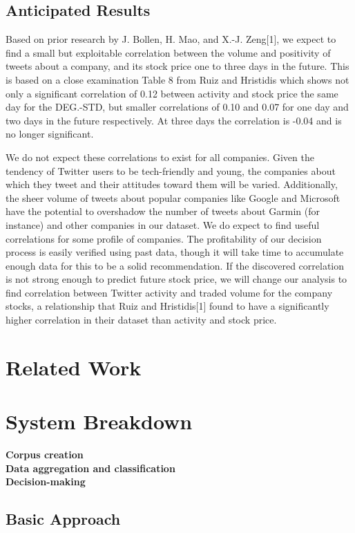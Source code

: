 \documentclass[letterpaper]{article}
\begin{document}
\subsection{Anticipated Results}
Based on prior research by J. Bollen, H. Mao, and X.-J. Zeng[1], we expect to find a small but exploitable correlation between the volume and positivity of tweets about a company, and its stock price one to three days in the future. This is based on a close examination Table 8 from Ruiz and Hristidis which shows not only a significant correlation of 0.12 between activity and stock price the same day for the DEG.-STD, but smaller correlations of 0.10 and 0.07 for one day and two days in the future respectively. At three days the correlation is -0.04 and is no longer significant.

We do not expect these correlations to exist for all companies. Given the tendency of Twitter users to be tech-friendly and young, the companies about which they tweet and their attitudes toward them will be varied. Additionally, the sheer volume of tweets about popular companies like Google and Microsoft have the potential to overshadow the number of tweets about Garmin (for instance) and other companies in our dataset. We do expect to find useful correlations for some profile of companies. The profitability of our decision process is easily verified using past data, though it will take time to accumulate enough data for this to be a solid recommendation. If the discovered correlation is not strong enough to predict future stock price, we will change our analysis to find correlation between Twitter activity and traded volume for the company stocks, a relationship that Ruiz and Hristidis[1] found to have a significantly higher correlation in their dataset than activity and stock price.

\section{Related Work}

\section{System Breakdown}
\textbf{Corpus creation}\\
\textbf{Data aggregation and classification}\\
\textbf{Decision-making}\\


\subsection{Basic Approach}
\end{document}
